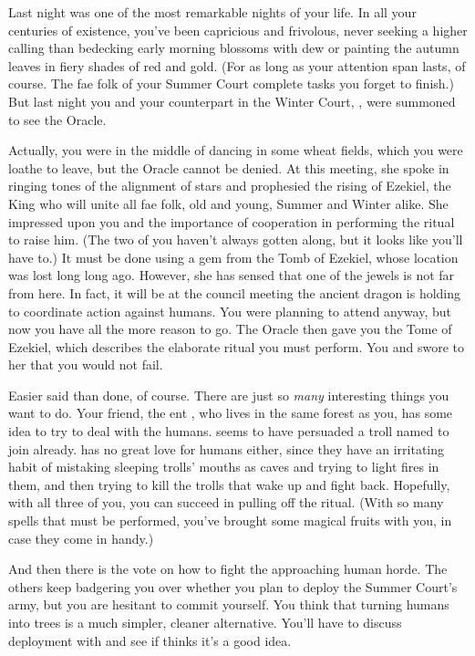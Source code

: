 \documentclass[char]{guildcamp2}
\begin{document}
\name{\cTreeFae{}}

Last night was one of the most remarkable nights of your life.  In all your centuries of existence, you've been capricious and frivolous, never seeking a higher calling than bedecking early morning blossoms with dew or painting the autumn leaves in fiery shades of red and gold.  (For as long as your attention span lasts, of course.  The fae folk of your Summer Court complete tasks you forget to finish.)  But last night you and your counterpart in the Winter Court, \cBabyFae{\intro}, were summoned to see the Oracle.

Actually, you were in the middle of dancing in some wheat fields, which you were loathe to leave, but the Oracle cannot be denied.  At this meeting, she spoke in ringing tones of the alignment of stars and prophesied the rising of Ezekiel, the King who will unite all fae folk, old and young, Summer and Winter alike.  She impressed upon you and \cBabyFae{} the importance of cooperation in performing the ritual to raise him.  (The two of you haven't always gotten along, but it looks like you'll have to.)  It must be done using a gem from the Tomb of Ezekiel, whose location was lost long long ago.  However, she has sensed that one of the jewels is not far from here.  In fact, it will be at the council meeting the ancient dragon \cOnyx{\intro} is holding to coordinate action against humans.  You were planning to attend anyway, but now you have all the more reason to go.  The Oracle then gave you the Tome of Ezekiel, which describes the elaborate ritual you must perform.  You and \cBabyFae{} swore to her that you would not fail.

Easier said than done, of course.  There are just so \emph{many} interesting things you want to do.  Your friend, the ent \cEnt{\intro}, who lives in the same forest as you, has some idea to try to deal with the humans.  \cEnt{} seems to have persuaded a troll named \cTroll{\intro} to join \cEnt{\them} already.  \cTroll{\They} has no great love for humans either, since they have an irritating habit of mistaking sleeping trolls' mouths as caves and trying to light fires in them, and then trying to kill the trolls that wake up and fight back.  Hopefully, with all three of you, you can succeed in pulling off the ritual.  (With so many spells that must be performed, you've brought some magical fruits with you, in case they come in handy.)

And then there is the vote on how to fight the approaching human horde.  The others keep badgering you over whether you plan to deploy the Summer Court's army, but you are hesitant to commit yourself.  You think that turning humans into trees is a much simpler, cleaner alternative.  You'll have to discuss deployment with \cBabyFae{} and see if \cBabyFae{\they} thinks it's a good idea.
\end{document}
